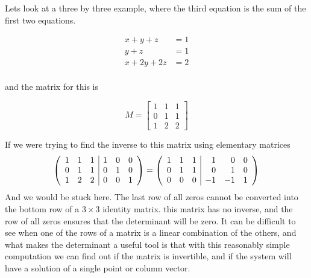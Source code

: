 {Lets look at a three by three example, where the third equation is the sum of the first two equations.

\begin{align*}
x+y + z &= 1\\
y +z &= 1\\
x + 2y+ 2z &= 2\\
\end{align*}

and the matrix for this is 

\[
M =\begin{bmatrix}
1 & 1 &1\\
0 & 1 & 1\\
1 & 2& 2 
\end{bmatrix}
\]

If we were trying to find the inverse to this matrix using elementary matrices
$$ \left( \begin{array}{ccc | ccc}
1 & 1 &1 & 	1 & 0 & 0\\
0 & 1 & 1 & 	0 & 1 & 0 \\
1 & 2 & 2 &	0 & 0 & 1
\end{array} \right) 
=
 \left( \begin{array}{ccc | rrr}
1 & 1 &1 & 	1 & 0 & 0\\
0 & 1 & 1 & 	0 & 1 & 0 \\
0 & 0 & 0 &	-1 & -1 & 1
\end{array} \right) 
$$
And we would be stuck here. The last row of all zeros cannot be converted into the bottom row of a $3 \times 3$ identity matrix. this matrix has no inverse, and the row of all zeros ensures that the determinant will be zero. It can be difficult to see when one of the rows of a matrix is a linear combination of the others, and what makes the determinant a useful tool is that with this reasonably simple computation we can find out if the matrix is invertible, and if the system will have a solution of a single point or column vector. 
} %

